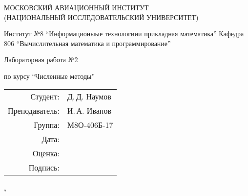 \begin{titlepage}
\begin{spacing}{1.2}
\begin{center}
{\large 
МОСКОВСКИЙ АВИАЦИОННЫЙ ИНСТИТУТ\\ 
(НАЦИОНАЛЬНЫЙ ИССЛЕДОВАТЕЛЬСКИЙ УНИВЕРСИТЕТ)
}
\vspace{24pt}

{\large
Институт №8 \enquote{Информационыые технологиии прикладная математика}
}
{\large
Кафедра 806 \enquote{Вычислительная математика и программирование}
}
\vspace{96pt}

\bfseries
{\Large
Лабораторная работа №2

по курсу \enquote{Численные методы}
}

\end{center}

\vspace{72pt}

\begin{flushright}
\begin{tabular}{r l}
    \large Студент: & \large Д.\,Д. Наумов \\
    \large Преподаватель: & \large И.\,А. Иванов \\
    \large Группа: \large & М8О-406Б-17 \\
    \large Дата: & \\
    \large Оценка: & \\
    \large Подпись: & \\
\end{tabular}
\end{flushright}

\vfill

\begin{center}
\bfseries
{}, \the\year
\end{center}
\end{spacing}
\end{titlepage}

\pagebreak
